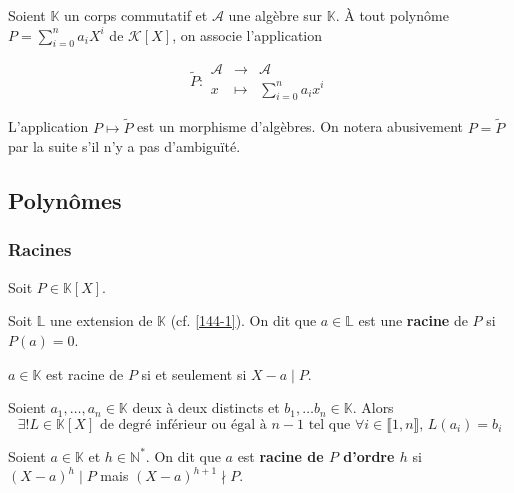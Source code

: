 




  Soient $\mathbb{K}$ un corps commutatif et $\mathcal{A}$ une algèbre sur $\mathbb{K}$. À tout polynôme $P = \sum_{i=0}^{n} a_i X^i$ de $\mathcal{K}[X]$, on associe l'application

  \[
    \widetilde{P} :
    \begin{array}{ccc}
      \mathcal{A} &\rightarrow& \mathcal{A} \\
      x &\mapsto& \sum_{i=0}^{n} a_i x^i
    \end{array}
  \]

  L'application $P \mapsto \widetilde{P}$ est un morphisme d'algèbres. On notera abusivement $P = \widetilde{P}$ par la suite s'il n'y a pas d'ambiguïté.

  \subsection{Polynômes}

  \subsubsection{Racines}


  Soit $P \in \mathbb{K}[X]$.

  \begin{definition}
    Soit $\mathbb{L}$ une extension de $\mathbb{K}$ (cf. \cref{144-1}). On dit que $a \in \mathbb{L}$ est une \textbf{racine} de $P$ si $P(a) = 0$.
  \end{definition}

  \begin{proposition}
    $a \in \mathbb{K}$ est racine de $P$ si et seulement si $X - a \mid P$.
  \end{proposition}

  \begin{application}
    Soient $a_1, \dots, a_n \in \mathbb{K}$ deux à deux distincts et $b_1, \dots b_n \in \mathbb{K}$. Alors
    \[ \exists! L \in \mathbb{K}[X] \text{ de degré inférieur ou égal à } n-1 \text{ tel que } \forall i \in \llbracket 1, n \rrbracket, \, L(a_i) = b_i \]
  \end{application}

  \begin{definition}
    Soient $a \in \mathbb{K}$ et $h \in \mathbb{N}^*$. On dit que $a$ est \textbf{racine de $P$ d'ordre $h$} si $(X-a)^h \mid P$ mais $(X-a)^{h+1} \nmid P$.
  \end{definition}

